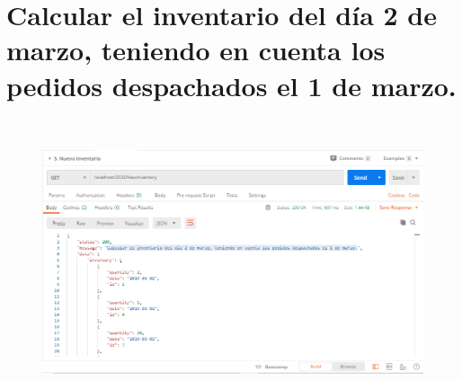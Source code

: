 \documentclass{article}
\begin{document}
\section{Calcular el inventario del día 2 de marzo, teniendo en cuenta los pedidos despachados el 1 de marzo.}
\\

\begin{figure}[h!]
\centering
\includegraphics[scale=0.5]{5.png}
\end{figure}
\end{document}
